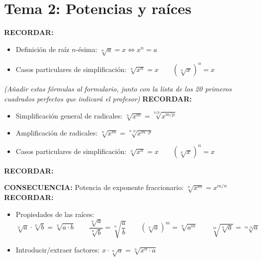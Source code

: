 \documentclass[a4paper,12pt]{article}
\newenvironment{boxsummary}{%
  \def\FrameCommand{\fcolorbox{black}{graybox}}%
  \MakeFramed{\FrameRestore}%
  \small\textbf{RECORDAR:}\par\smallskip
}{%
  \endMakeFramed
}
\begin{document}
\section*{Tema 2: Potencias y raíces}

\begin{boxsummary}
\begin{itemize}[leftmargin=*, itemsep=2pt]
    \item Definición de raíz $n$-ésima: $\sqrt[n]{a} = x \Leftrightarrow x^n = a$
    \item Casos particulares de simplificación: $\sqrt[n]{x^n} = x \qquad (\sqrt[n]{x})^n = x$
\end{itemize}
\textit{(Añadir estas fórmulas al formulario, junto con la lista de los 20 primeros cuadrados perfectos que indicará el profesor)}
\end{boxsummary}
\begin{boxsummary}
\begin{itemize}[leftmargin=*, itemsep=2pt]
    \item Simplificación general de radicales: $\sqrt[n]{x^m} = \sqrt[n/p]{x^{m/p}}$
    \item Amplificación de radicales: $\sqrt[n]{x^m} = \sqrt[n \cdot p]{x^{m \cdot p}}$
    \item Casos particulares de simplificación: $\sqrt[n]{x^n} = x \qquad (\sqrt[n]{x})^n = x$
\end{itemize}
\end{boxsummary}
\begin{boxsummary}
\textbf{CONSECUENCIA:} Potencia de exponente fraccionario: $\sqrt[n]{x^m} = x^{m/n}$
\end{boxsummary}
\begin{boxsummary}
\begin{itemize}[leftmargin=*, itemsep=2pt]
    \item Propiedades de las raíces:
    \[ \sqrt[n]{a} \cdot \sqrt[n]{b} = \sqrt[n]{a \cdot b} \qquad \frac{\sqrt[n]{a}}{\sqrt[n]{b}} = \sqrt[n]{\frac{a}{b}} \qquad (\sqrt[n]{a})^m = \sqrt[n]{a^m} \qquad \sqrt[m]{\sqrt[n]{a}} = \sqrt[m \cdot n]{a} \]
    \item Introducir/extraer factores: $x \cdot \sqrt[n]{a} = \sqrt[n]{x^n \cdot a}$
\end{itemize}
\end{boxsummary}
\end{document}
